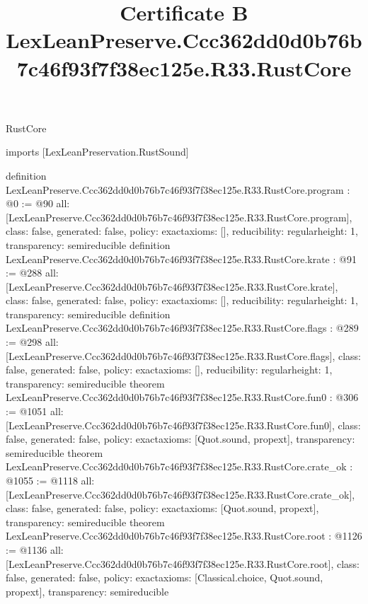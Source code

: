 \begin{lexlean}{RustCore}
\title{Certificate B LexLeanPreserve.Ccc362dd0d0b76b7c46f93f7f38ec125e.R33.RustCore}
\begin{coremodule}
imports [LexLeanPreservation.RustSound]

definition LexLeanPreserve.Ccc362dd0d0b76b7c46f93f7f38ec125e.R33.RustCore.program : @0 := @90 {
  all: [LexLeanPreserve.Ccc362dd0d0b76b7c46f93f7f38ec125e.R33.RustCore.program],
  class: false,
  generated: false,
  policy: exact{axioms: []},
  reducibility: regular{height: 1},
  transparency: semireducible
}
definition LexLeanPreserve.Ccc362dd0d0b76b7c46f93f7f38ec125e.R33.RustCore.krate : @91 := @288 {
  all: [LexLeanPreserve.Ccc362dd0d0b76b7c46f93f7f38ec125e.R33.RustCore.krate],
  class: false,
  generated: false,
  policy: exact{axioms: []},
  reducibility: regular{height: 1},
  transparency: semireducible
}
definition LexLeanPreserve.Ccc362dd0d0b76b7c46f93f7f38ec125e.R33.RustCore.flags : @289 := @298 {
  all: [LexLeanPreserve.Ccc362dd0d0b76b7c46f93f7f38ec125e.R33.RustCore.flags],
  class: false,
  generated: false,
  policy: exact{axioms: []},
  reducibility: regular{height: 1},
  transparency: semireducible
}
theorem LexLeanPreserve.Ccc362dd0d0b76b7c46f93f7f38ec125e.R33.RustCore.fun0 : @306 := @1051 {
  all: [LexLeanPreserve.Ccc362dd0d0b76b7c46f93f7f38ec125e.R33.RustCore.fun0],
  class: false,
  generated: false,
  policy: exact{axioms: [Quot.sound, propext]},
  transparency: semireducible
}
theorem LexLeanPreserve.Ccc362dd0d0b76b7c46f93f7f38ec125e.R33.RustCore.crate_ok : @1055 := @1118 {
  all: [LexLeanPreserve.Ccc362dd0d0b76b7c46f93f7f38ec125e.R33.RustCore.crate_ok],
  class: false,
  generated: false,
  policy: exact{axioms: [Quot.sound, propext]},
  transparency: semireducible
}
theorem LexLeanPreserve.Ccc362dd0d0b76b7c46f93f7f38ec125e.R33.RustCore.root : @1126 := @1136 {
  all: [LexLeanPreserve.Ccc362dd0d0b76b7c46f93f7f38ec125e.R33.RustCore.root],
  class: false,
  generated: false,
  policy: exact{axioms: [Classical.choice, Quot.sound, propext]},
  transparency: semireducible
}


\end{coremodule}
\end{lexlean}
